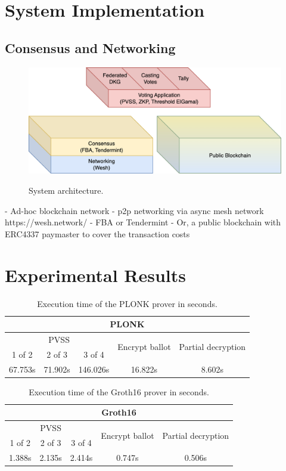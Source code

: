 \documentclass{article}
\begin{document}
\section{System Implementation}

\subsection{Consensus and Networking}

\begin{figure}
    \centering
    \includegraphics[width=\textwidth]{stack-bc.png}
    \label{fig:stack-bc}
    \caption{System architecture.}
\end{figure}

- Ad-hoc blockchain network
- p2p networking via async mesh network https://wesh.network/
- FBA or Tendermint
- Or, a public blockchain with ERC4337 paymaster to cover the transaction costs

\section{Experimental Results}

\begin{table}
\centering
\label{table:plonk-time}
\caption{Execution time of the PLONK prover in seconds.}
\begin{tabular}{|c|c|c|c|c|}
    \hline
    \multicolumn{5}{|c|}{PLONK} \\
    \hline
    \multicolumn{3}{|c|}{PVSS} & \multirow{2}{*}{Encrypt ballot} & \multirow{2}{*}{Partial decryption} \\
    \cline{1-3}
    1 of 2 & 2 of 3 & 3 of 4 & & \\
    \hline
    67.753s & 71.902s & 146.026s & 16.822s & 8.602s\\
    \hline
\end{tabular}
\end{table}

\begin{table}
\centering
\label{table:groth16-time}
\caption{Execution time of the Groth16 prover in seconds.}
\begin{tabular}{|c|c|c|c|c|}
    \hline
    \multicolumn{5}{|c|}{Groth16} \\
    \hline
    \multicolumn{3}{|c|}{PVSS} & \multirow{2}{*}{Encrypt ballot} & \multirow{2}{*}{Partial decryption} \\
    \cline{1-3}
    1 of 2 & 2 of 3 & 3 of 4 & & \\
    \hline
    1.388s & 2.135s & 2.414s & 0.747s & 0.506s\\
    \hline
\end{tabular}
\end{table}
\end{document}
